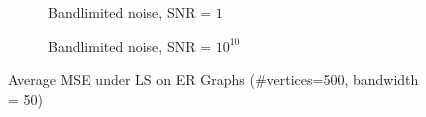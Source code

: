 \begin{figure}
\begin{subfigure}{0.3\columnwidth}
    \caption{Bandlimited noise, SNR = $1$}%
    \label{bandlimited_MSE_subfigb}%
    \end{subfigure}\hfill%
    \begin{subfigure}{0.3\columnwidth}
    \caption{Bandlimited noise, SNR = $10^{10}$}%
    \label{bandlimited_MSE_subfigc}%
    \end{subfigure}%
    \caption{Average MSE under LS on ER Graphs (\#vertices=500, bandwidth = 50) }
\label{LS_ER_MSE_fig_bl}
\end{figure}


